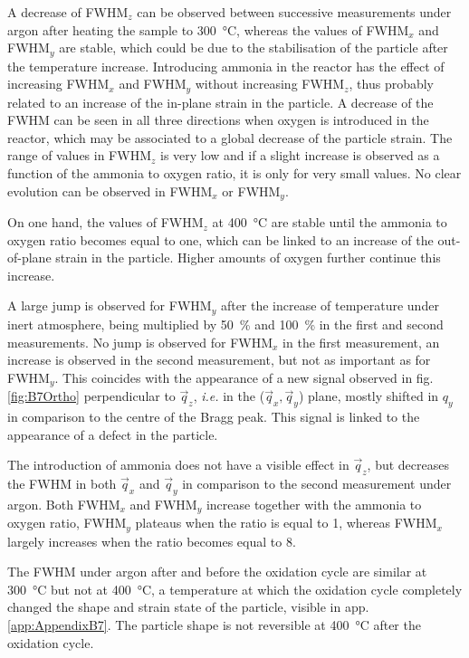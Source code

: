 A decrease of FWHM$_z$ can be observed between successive measurements under argon after heating the sample to \qty{300}{\degreeCelsius}, whereas the values of FWHM$_x$ and FWHM$_y$ are stable, which could be due to the stabilisation of the particle after the temperature increase.
Introducing ammonia in the reactor has the effect of increasing FWHM$_x$ and FWHM$_y$ without increasing FWHM$_z$, thus probably related to an increase of the in-plane strain in the particle.
A decrease of the FWHM can be seen in all three directions when oxygen is introduced in the reactor, which may be associated to a global decrease of the particle strain.
The range of values in FWHM$_z$ is very low and if a slight increase is observed as a function of the ammonia to oxygen ratio, it is only for very small values.
No clear evolution can be observed in FWHM$_x$ or FWHM$_y$.

On one hand, the values of FWHM$_z$ at \qty{400}{\degreeCelsius} are stable until the ammonia to oxygen ratio becomes equal to one, which can be linked to an increase of the out-of-plane strain in the particle.
Higher amounts of oxygen further continue this increase.

A large jump is observed for FWHM$_y$ after the increase of temperature under inert atmosphere, being multiplied by \qty{50}{\percent} and \qty{100}{\percent} in the first and second measurements.
No jump is observed for FWHM$_x$ in the first measurement, an increase is observed in the second measurement, but not as important as for FWHM$_y$.
This coincides with the appearance of a new signal observed in fig. \ref{fig:B7Ortho} perpendicular to $\vec{q}_z$, \textit{i.e.} in the ($\vec{q}_x, \vec{q}_y$) plane, mostly shifted in $q_y$ in comparison to the centre of the Bragg peak.
This signal is linked to the appearance of a defect in the particle.

The introduction of ammonia does not have a visible effect in $\vec{q}_z$, but decreases the FWHM in both $\vec{q}_x$ and $\vec{q}_y$ in comparison to the second measurement under argon.
Both FWHM$_x$ and FWHM$_y$ increase together with the ammonia to oxygen ratio, FWHM$_y$ plateaus when the ratio is equal to 1, whereas FWHM$_x$ largely increases when the ratio becomes equal to 8.

The FWHM under argon after and before the oxidation cycle are similar at \qty{300}{\degreeCelsius} but not at \qty{400}{\degreeCelsius}, a temperature at which the oxidation cycle completely changed the shape and strain state of the particle, visible in app. \ref{app:AppendixB7}.
The particle shape is not reversible at \qty{400}{\degreeCelsius} after the oxidation cycle.

